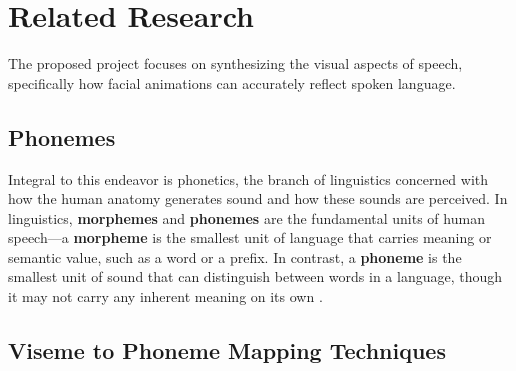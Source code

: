 \documentclass[12pt]{article}
\begin{document}
\section{Related Research}
\label{sec:relatedResearch}

 The proposed project focuses on synthesizing the visual aspects of speech, specifically how facial animations can accurately reflect spoken language. 
 
 \subsection{Phonemes} 
 \label{sec:phonemes}
 Integral to this endeavor is phonetics, the branch of linguistics concerned with how the human anatomy generates sound and how these sounds are perceived. In linguistics, \textbf{morphemes} and \textbf{phonemes} are the fundamental units of human speech—a \textbf{morpheme} is the smallest unit of language that carries meaning or semantic value, such as a word or a prefix. In contrast, a \textbf{phoneme} is the smallest unit of sound that can distinguish between words in a language, though it may not carry any inherent meaning on its own \cite{Payack2008AWorld}.

\subsection{Viseme to Phoneme Mapping Techniques}

\end{document}
